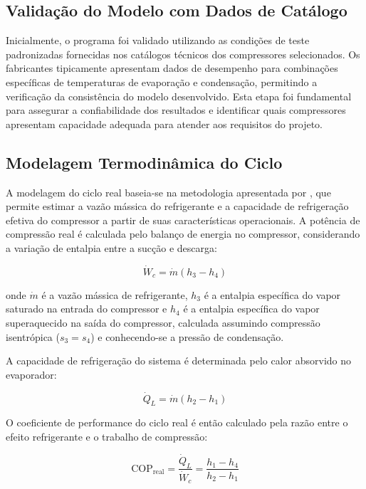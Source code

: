 \subsection{Validação do Modelo com Dados de Catálogo}

Inicialmente, o programa foi validado utilizando as condições de teste padronizadas fornecidas nos catálogos técnicos dos compressores selecionados. Os fabricantes tipicamente apresentam dados de desempenho para combinações específicas de temperaturas de evaporação e condensação, permitindo a verificação da consistência do modelo desenvolvido. Esta etapa foi fundamental para assegurar a confiabilidade dos resultados e identificar quais compressores apresentam capacidade adequada para atender aos requisitos do projeto.

\subsection{Modelagem Termodinâmica do Ciclo}

A modelagem do ciclo real baseia-se na metodologia apresentada por \cite{paper_referencia}, que permite estimar a vazão mássica do refrigerante e a capacidade de refrigeração efetiva do compressor a partir de suas características operacionais. A potência de compressão real é calculada pelo balanço de energia no compressor, considerando a variação de entalpia entre a sucção e descarga:

\begin{equation}
    \dot{W}_c = \dot{m}(h_3 - h_4)
    \label{W compressor}
\end{equation}

\noindent onde $\dot{m}$ é a vazão mássica de refrigerante, $h_3$ é a entalpia específica do vapor saturado na entrada do compressor e $h_4$ é a entalpia específica do vapor superaquecido na saída do compressor, calculada assumindo compressão isentrópica ($s_3 = s_4$) e conhecendo-se a pressão de condensação.

A capacidade de refrigeração do sistema é determinada pelo calor absorvido no evaporador:

\begin{equation}
    \dot{Q}_L = \dot{m}(h_2 - h_1)
    \label{capacidade evaporador}
\end{equation}

O coeficiente de performance do ciclo real é então calculado pela razão entre o efeito refrigerante e o trabalho de compressão:

\begin{equation}
    \text{COP}_{\text{real}} = \frac{\dot{Q}_L}{\dot{W}_c} = \frac{h_1 - h_4}{h_2 - h_1}
    \label{cop real}
\end{equation}

